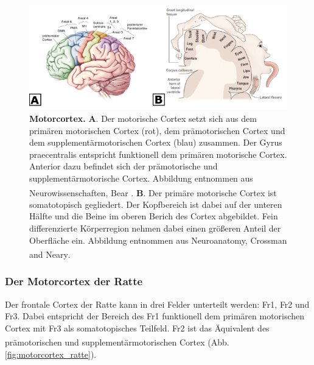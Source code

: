 \documentclass[12pt,a4paper,pdftex]{article}
\begin{document}
\begin{figure}[H]
    \centering
    \includegraphics[width=\textwidth]{pictures/Bilder_Laura/Motorcortex_2.png}
    \caption[Motorcortex]{\textbf{Motorcortex.} \textbf{A}. Der motorische Cortex setzt sich aus dem primären motorischen Cortex (rot), dem prämotorischen Cortex und dem supplementärmotorischen Cortex (blau) zusammen. Der Gyrus praecentralis entspricht funktionell dem primären motorische Cortex. Anterior dazu befindet sich der prämotorische und supplementärmotorische Cortex. Abbildung entnommen aus Neurowissenschaften, Bear \textsuperscript{\cite[14]{neurowissenschaften_baer}}. \textbf{B}. Der primäre motorische Cortex ist somatotopisch gegliedert. Der Kopfbereich ist dabei auf der unteren Hälfte und die Beine im oberen Berich des Cortex abgebildet. Fein differenzierte Körperregion nehmen dabei einen größeren Anteil der Oberfläche ein. Abbildung entnommen aus Neuroanatomy, Crossman and Neary\textsuperscript{\cite[8]{crossman2014neuroanatomy}}.}
    \label{fig:motorkortex}
\end{figure}

\subsubsection*{Der Motorcortex der Ratte}
Der frontale Cortex der Ratte kann in drei Felder unterteilt werden: Fr1, Fr2 und Fr3. 
Dabei entspricht der Bereich des Fr1 funktionell dem primären motorischen Cortex mit Fr3 als somatotopisches Teilfeld. Fr2 ist das Äquivalent des prämotorischen und supplementärmotorischen Cortex \textsuperscript{\cite[22]{paxinos2014rat}}(Abb. \ref{fig:motorcortex_ratte}).  
\end{document}
